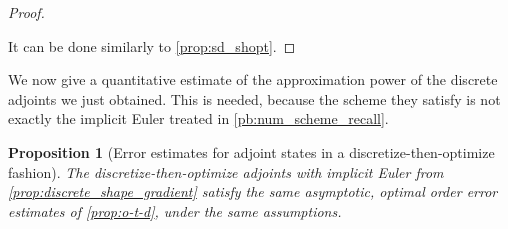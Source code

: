 \documentclass[english,a4paper,10pt,oneside]{scrbook}	%
\theoremstyle{break}
\newtheorem{prop}[equation]{Proposition}
\newenvironment{mproof}[1][\proofname]{%
  \begin{proof}[#1]$ $\par\nobreak\ignorespaces
}{%
  \end{proof}
}
\renewcommand*{\proofname}{Proof}
\theoremstyle{remark}
\begin{document}
\begin{mproof}[Proof]
It can be done similarly to \cref{prop:sd_shopt}.
\end{mproof}


We now give a quantitative estimate of the approximation power of the discrete adjoints we just obtained. This is needed, because the scheme they satisfy is not exactly the implicit Euler treated in \cref{pb:num_scheme_recall}.

\begin{prop}[Error estimates for adjoint states in a discretize-then-optimize fashion]
\label{prop:d-t-o_estimates}
The discretize-then-optimize adjoints with implicit Euler from \cref{prop:discrete_shape_gradient} satisfy the same asymptotic, optimal order error estimates of \cref{prop:o-t-d}, under the same assumptions.
\end{prop}
\end{document}
